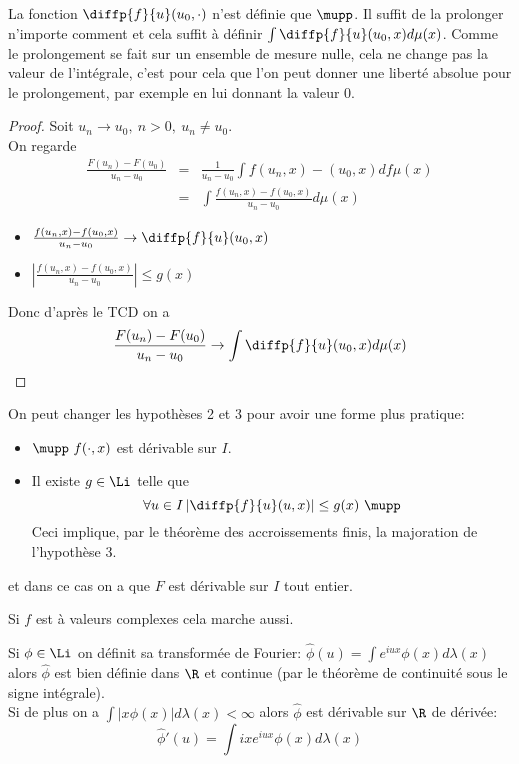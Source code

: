 \begin{remarque}
	La fonction $\diffp{f}{u}(u_0,\cdot)$ n'est définie que $\mupp$. Il suffit de
	la prolonger n'importe comment et cela suffit à définir $\int \diffp{f}{u}(u_0,x)d\mu(x)$.
	Comme le prolongement se fait sur un ensemble de mesure nulle, cela ne change pas la valeur de l'intégrale,
	c'est pour cela que l'on peut donner une liberté absolue pour le prolongement, par exemple en lui donnant la valeur 0.
\end{remarque}

\begin{proof}
	Soit $u_n \to u_0, \ n > 0, \ u_n \neq u_0$. \\
	On regarde
	\begin{eqnarray*}
		\frac{F(u_n)-F(u_0)}{u_n-u_0} &=& \frac{1}{u_n-u_0} \int f(u_n,x) -(u_0,x)df\mu(x) \\
		&=& \int \frac{f(u_n,x) - f(u_0,x)}{u_n-u_0}d\mu(x)
	\end{eqnarray*}
	\begin{itemize}
		\item $\frac{f(u_n,x)- f(u_0,x)}{u_n-u_0} \to \diffp{f}{u}(u_0,x)$
		\item $\left|\frac{f(u_n,x)- f(u_0,x)}{u_n-u_0} \right| \leq g(x)$
	\end{itemize}
	Donc d'après le TCD on a %
	$$ \frac{F(u_n)- F(u_0)}{u_n-u_0} \to \int \diffp{f}{u}(u_0,x) d\mu(x)$$

\end{proof}

\begin{remarque}
	On peut changer les hypothèses 2 et 3 pour avoir une forme plus pratique:
	\begin{itemize}
		\item $\mupp\  f(\cdot, x)$ est dérivable sur $I$.
		\item Il existe $g\in \Li$ telle que
		      $$ \forall u\in I \left|\diffp{f}{u}(u,x)\right| \leq g(x) \ \mupp$$
		      Ceci implique, par le théorème des accroissements finis, la majoration de l'hypothèse 3.
	\end{itemize}
	et dans ce cas on a que $F$ est dérivable sur $I$ tout entier.
\end{remarque}

\begin{remarque}
	Si $f$ est à valeurs complexes cela marche aussi.
\end{remarque}


\begin{example}
	Si $\phi \in \Li$ on définit sa transformée de Fourier:
	$\hat{\phi}(u) = \int e^{iux}\phi(x) d\lambda(x)$
	alors $\hat{\phi}$ est bien définie dans $\R$ et continue (par le théorème de continuité sous le signe intégrale).\\
	Si de plus on a $\int |x\phi(x)|d\lambda(x)<\infty$ alors $\hat{\phi}$ est dérivable sur $\R$ de dérivée:
	$$\hat{\phi}'(u)= \int ixe^{iux}\phi(x)d\lambda(x)$$
\end{example}



